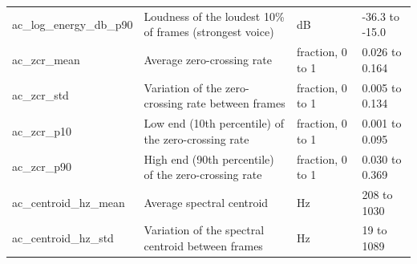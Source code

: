 \documentclass[11pt,a4paper]{article}
\begin{document}
\begin{center}
\begin{longtable}{>{\raggedright\arraybackslash}p{3.70cm}>{\raggedright\arraybackslash}p{6.65cm}>{\raggedright\arraybackslash}p{1.90cm}>{\raggedright\arraybackslash}p{2.56cm}}
\hspace{0pt}ac\_\allowbreak{}log\_\allowbreak{}energy\_\allowbreak{}db\_\allowbreak{}p90 & \hspace{0pt}Loudness of the loudest 10\% of frames (strongest voice) & \hspace{0pt}dB & \hspace{0pt}-36.3 to -15.0\\
\hspace{0pt}ac\_\allowbreak{}zcr\_\allowbreak{}mean & \hspace{0pt}Average zero-crossing rate & \hspace{0pt}fraction, 0 to 1 & \hspace{0pt}0.026 to 0.164\\
\hspace{0pt}ac\_\allowbreak{}zcr\_\allowbreak{}std & \hspace{0pt}Variation of the zero-crossing rate between frames & \hspace{0pt}fraction, 0 to 1 & \hspace{0pt}0.005 to 0.134\\
\hspace{0pt}ac\_\allowbreak{}zcr\_\allowbreak{}p10 & \hspace{0pt}Low end (10th percentile) of the zero-crossing rate & \hspace{0pt}fraction, 0 to 1 & \hspace{0pt}0.001 to 0.095\\
\hspace{0pt}ac\_\allowbreak{}zcr\_\allowbreak{}p90 & \hspace{0pt}High end (90th percentile) of the zero-crossing rate & \hspace{0pt}fraction, 0 to 1 & \hspace{0pt}0.030 to 0.369\\
\hspace{0pt}ac\_\allowbreak{}centroid\_\allowbreak{}hz\_\allowbreak{}mean & \hspace{0pt}Average spectral centroid & \hspace{0pt}Hz & \hspace{0pt}208 to 1030\\
\hspace{0pt}ac\_\allowbreak{}centroid\_\allowbreak{}hz\_\allowbreak{}std & \hspace{0pt}Variation of the spectral centroid between frames & \hspace{0pt}Hz & \hspace{0pt}19 to 1089\\

\end{longtable}
\end{center}
\end{document}
